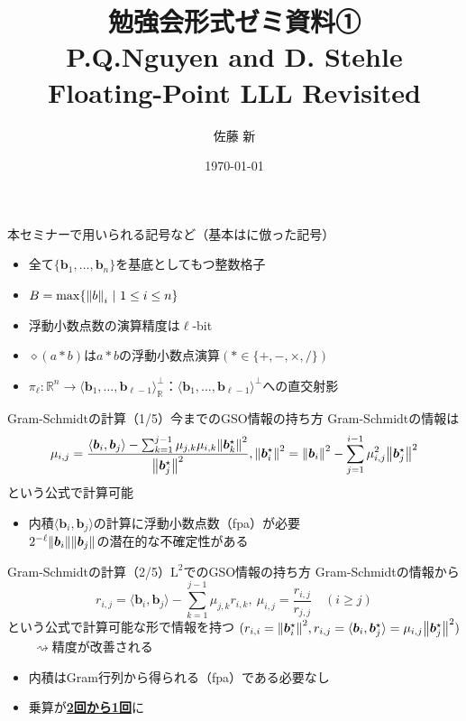 \documentclass[12pt,aspectratio=169,table,dvipdfmx, leqno]{beamer}
\title[勉強会]{勉強会形式ゼミ資料①\\P.Q.Nguyen and D. Stehle Floating-Point LLL Revisited\cite{NS05}}
\author[佐藤]{佐藤 新}
\date{\today}
\begin{document}
\maketitle

\begin{frame}
    本セミナーで用いられる記号など（基本は\cite{NS05}に倣った記号）
    \begin{itemize}
        \item 全て$\{\bm{b}_1,\ldots,\bm{b}_n\}$を基底としてもつ整数格子
        \item $B=\max\{\norm{b}_i~|~1\le i\le n\}$
        \item 浮動小数点数の演算精度は$\ell$-bit
        \item $\diamond(a*b)$は$a*b$の浮動小数点演算$(*\in\{+, -, \times, /\})$
        \item $\pi_\ell:\mathbb{R}^n\to \langle\bm{b}_1,\ldots,\bm{b}_{\ell-1}\rangle_\mathbb{R}^\perp$：$\langle\bm{b}_1,\ldots,\bm{b}_{\ell-1}\rangle^\perp$への直交射影
    \end{itemize}
\end{frame}

\begin{frame}{Gram-Schmidtの計算（1/5）}{今までのGSO情報の持ち方}
    Gram-Schmidtの情報は
    \[
    \mu_{i, j}=\frac{\langle \bm{b}_i, \bm{b}_j\rangle-\sum_{k=1}^{j-1}\mu_{j, k}\mu_{i, k}\norm{\bm{b}_k^\star}^2}{\norm{\bm{b}_j^\star}^2}, \norm{\bm{b}_i^\star}^2=\norm{\bm{b}_i}^2-\sum_{j=1}^{i-1}\mu_{i, j}^2\norm{\bm{b}_j^\star}^2
    \]
    という公式で計算可能

    \begin{itemize}
        \item 内積$\langle \bm{b}_i, \bm{b}_j\rangle$の計算に浮動小数点数（fpa）が必要\\
        \quad\quad $2^{-\ell}\norm{\bm{b}_i}\norm{\bm{b}_j}$の潜在的な不確定性がある
    \end{itemize}
\end{frame}

\begin{frame}{Gram-Schmidtの計算（2/5）}{$\text{L}^2$でのGSO情報の持ち方}
    Gram-Schmidtの情報から
    \[
    r_{i, j}=\langle \bm{b}_i, \bm{b}_j\rangle-\sum_{k=1}^{j-1}\mu_{j, k}r_{i, k},~\mu_{i, j}=\frac{r_{i, j}}{r_{j, j}}\quad(i\ge j)
    \]
    という公式で計算可能な形で情報を持つ$~(r_{i, i}=\norm{\bm{b}_i^\star}^2, r_{i, j}=\langle\bm{b}_i, \bm{b}_j^\star\rangle=\mu_{i, j}\norm{\bm{b}_j^\star}^2)$\\
    $\quad\quad\rightsquigarrow$精度が改善される
    \begin{itemize}
        \item 内積はGram行列から得られる（fpa）である必要なし
        \item 乗算が\underline{\textbf{2回から1回}}に
    \end{itemize}
\end{frame}
\end{document}
